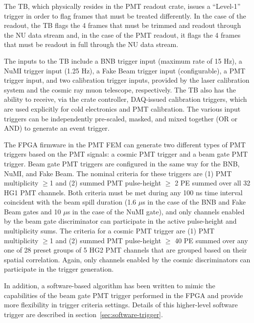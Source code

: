 The TB, which physically resides in the PMT readout crate, issues a ``Level-1'' trigger in order to flag frames that must be treated differently. In the case of the \lartpc readout, the TB flags the 4 frames that must be trimmed and readout through the NU data stream and, in the case of the PMT readout, it flags the 4 frames that must be readout in full through the NU data stream.

The inputs to the TB include a BNB trigger input (maximum rate of 15 Hz), a NuMI trigger input (1.25 Hz), a Fake Beam trigger input (configurable), a PMT trigger input, and two calibration trigger inputs, provided by the laser calibration system and the cosmic ray muon telescope, respectively. The TB also has the ability to receive, via the crate controller, DAQ-issued calibration triggers, which are used explicitly for cold electronics and PMT calibration. The various input triggers can be independently pre-scaled, masked, and mixed together (OR or AND) to generate an event trigger.

The FPGA firmware in the PMT FEM can generate two different types of PMT triggers based on the PMT signals: a cosmic PMT trigger and a beam gate PMT trigger. Beam gate PMT triggers are configured in the same way for the BNB, NuMI, and Fake Beam. The nominal criteria for these triggers are (1) PMT multiplicity $\ge$1 and (2) summed PMT pulse-height $\ge$ 2 PE summed over all 32 HG1 PMT channels. Both criteria must be met during any 100 ns time interval coincident with the beam spill duration (1.6 $\mu$s in the case of the BNB and Fake Beam gates and 10 $\mu$s in the case of the NuMI gate), and only channels enabled by the beam gate discriminator can participate in the active pulse-height and multiplicity sums. The criteria for a cosmic PMT trigger are (1) PMT multiplicity $\ge$1 and (2) summed PMT pulse-height $\ge$ 40 PE summed over any one of 28 preset groups of 5 HG2 PMT channels that are grouped based on their spatial correlation. Again, only channels enabled by the cosmic discriminators can participate in the trigger generation.

In addition, a software-based algorithm has been written to mimic the capabilities of the beam gate PMT trigger performed in the FPGA and provide more flexibility in trigger criteria settings. Details of this higher-level software trigger are described in section~\ref{sec:software-trigger}.


